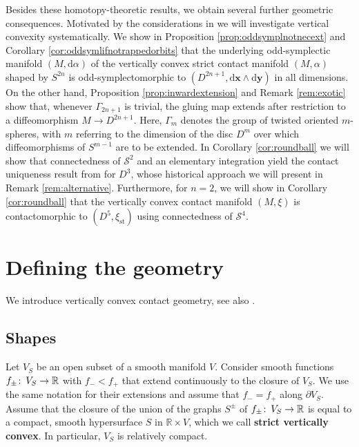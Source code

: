 \documentclass{amsart}
\theoremstyle{definition}
\def\co{\colon\thinspace}
\newcommand{\rmd}{\mathrm d}
\newcommand{\R}{\mathbb R}
\renewcommand{\SS}{\mathcal S}
\newcommand{\bfx}{\mathbf x}
\newcommand{\bfy}{\mathbf y}
\newcommand{\ra}{\rightarrow}
\DeclareMathOperator{\st}{\mathrm{st}}
\begin{document}
Besides these homotopy-theoretic results,
we obtain several further geometric consequences.
Motivated by the considerations in \cite{beck23,kschz20}
we will investigate vertical convexity systematically.
We show in Proposition \ref{prop:oddsymplnotnecext}
and Corollary \ref{cor:oddsymlifnotrappedorbits}
that the underlying odd-symplectic manifold $(M,\rmd\alpha)$
of the vertically convex strict contact manifold $(M,\alpha)$
shaped by $S^{2n}$ is odd-symplectomorphic to
$(D^{2n+1},\rmd\bfx\wedge\rmd\bfy)$ in all dimensions.
On the other hand,
Proposition \ref{prop:inwardextension}
and Remark \ref{rem:exotic}
show that, whenever $\Gamma_{2n+1}$ is trivial,
the gluing map extends after restriction
to a diffeomorphism $M\ra D^{2n+1}$.
Here, $\Gamma_m$ denotes the group
of twisted oriented $m$-spheres,
with $m$ referring to the dimension of the disc $D^m$
over which diffeomorphisms of $S^{m-1}$
are to be extended.
In Corollary \ref{cor:roundball}
we will show that connectedness of $\SS^2$
and an elementary integration
yield the contact uniqueness result
from \cite[p.\ 1305, Item~1.b)]{eh94} for $D^3$,
whose historical approach we will present
in Remark \ref{rem:alternative}.
Furthermore, for $n=2$, we will show
in Corollary \ref{cor:roundball}
that the vertically convex contact manifold $(M,\xi)$
is contactomorphic to $(D^5,\xi_{\st})$
using connectedness of $\SS^4$.





\section{Defining the geometry}
\label{sec:defthegeom}


We introduce vertically convex contact geometry,
see also \cite{beck23,efz,kschz20}.



\subsection{Shapes}

Let $V_S$ be an open subset of a smooth manifold $V$.
Consider smooth functions
$f_{\pm}\co V_S\ra\R$ with $f_-<f_+$
that extend continuously to the closure of $V_S$.
We use the same notation for their extensions
and assume that $f_-=f_+$ along $\partial V_S$.
Assume that the closure of the union
of the graphs $S^{\pm}$ of $f_{\pm}\co V_S\ra\R$
is equal to a compact, smooth hypersurface $S$ in $\R\times V$,
which we call {\bf strict vertically convex}.
In particular, $V_S$ is relatively compact.
\end{document}

